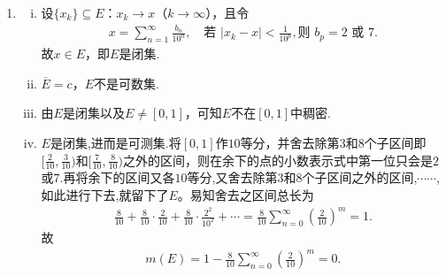 \documentclass[../../main.tex]{subfiles}%
\begin{document}
\begin{solution}
\begin{enumerate}[(1)]
\item \begin{enumerate}[(i)]
\item 设$\{x_k\}\subseteq E$：$x_k\to x$（$k\to\infty$），且令
\begin{align*}
x = \sum\limits_{n=1}^{\infty}\frac{b_n}{10^n}, \quad \text{若 }|x_k - x| < \frac{1}{10^p}, \text{则 }b_p = 2\text{ 或 }7.
\end{align*}
故$x\in E$，即$E$是闭集.

\item $\overline{E}=c$，$E$不是可数集.

\item 由$E$是闭集以及$E\neq[0,1]$，可知$E$不在$[0,1]$中稠密.

\item $E$是闭集,进而是可测集.将$[0,1]$作$10$等分，并舍去除第$3$和$8$个子区间即$[\frac{2}{10},\frac{3}{10})$和$[\frac{7}{10},\frac{8}{10})$之外的区间，则在余下的点的小数表示式中第一位只会是$2$或$7$.再将余下的区间又各$10$等分,又舍去除第$3$和$8$个子区间之外的区间,$\cdots \cdots$,如此进行下去,就留下了$E$。易知舍去之区间总长为
\begin{align*}
\frac{8}{10}+\frac{8}{10}\cdot \frac{2}{10}+\frac{8}{10}\cdot \frac{2^2}{10^2}+\cdots =\frac{8}{10}\sum_{n=0}^{\infty}{\left( \frac{2}{10} \right) ^m}=1.
\end{align*}
故
\begin{align*}
m(E) = 1 - \frac{8}{10}\sum_{n=0}^{\infty}{\left( \frac{2}{10} \right) ^m}= 0.
\end{align*}
\end{enumerate}
\end{enumerate}

\end{solution}
\end{document}
